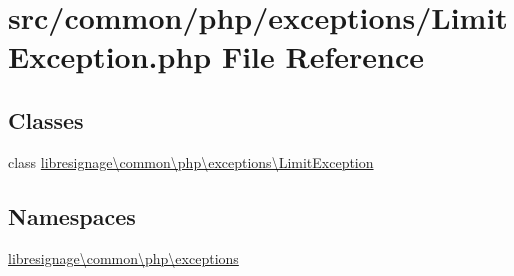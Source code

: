 \hypertarget{LimitException_8php}{}\section{src/common/php/exceptions/\+Limit\+Exception.php File Reference}
\label{LimitException_8php}
\subsection*{Classes}
\begin{DoxyCompactItemize}
\item 
class \hyperlink{classlibresignage_1_1common_1_1php_1_1exceptions_1_1LimitException}{libresignage\textbackslash{}common\textbackslash{}php\textbackslash{}exceptions\textbackslash{}\+Limit\+Exception}
\end{DoxyCompactItemize}
\subsection*{Namespaces}
\begin{DoxyCompactItemize}
\item 
 \hyperlink{namespacelibresignage_1_1common_1_1php_1_1exceptions}{libresignage\textbackslash{}common\textbackslash{}php\textbackslash{}exceptions}
\end{DoxyCompactItemize}
